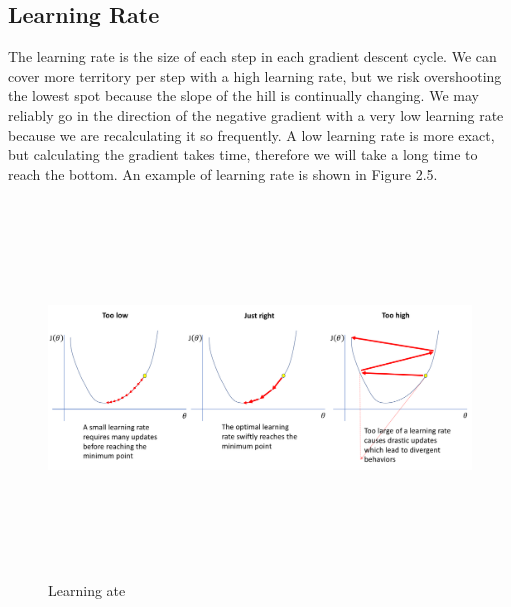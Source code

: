 \subsection{Learning Rate}
\label{subsec:learning_rate}
The learning rate is the size of each step in each gradient descent cycle. We can cover more territory per step with a high learning rate, but we risk overshooting the lowest spot because the slope of the hill is continually changing. We may reliably go in the direction of the negative gradient with a very low learning rate because we are recalculating it so frequently. A low learning rate is more exact, but calculating the gradient takes time, therefore we will take a long time to reach the bottom. An example of learning rate is shown in Figure 2.5.
\newpage
\begin{figure}[!h]
	\centering
	\includegraphics[width=\linewidth, height=10cm,keepaspectratio]{figures/learning rate.png}
   \caption{Learning ate}
\end{figure}

